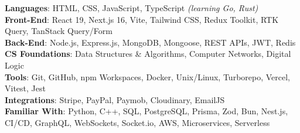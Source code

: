 \documentclass[letterpaper,11pt]{article}
\begin{document}
\begin{itemize}[leftmargin=0.15in, label={}]
  \small{\item{
      \textbf{Languages}{: HTML, CSS, JavaScript, TypeScript
        \emph{(learning Go, Rust)}}
      \\
      \textbf{Front-End}{: React 19, Next.js 16, Vite, Tailwind CSS, Redux
        Toolkit, RTK Query, TanStack Query/Form}
      \\
      \textbf{Back-End}{: Node.js, Express.js, MongoDB, Mongoose, REST APIs,
        JWT, Redis}
      \\
      \textbf{CS Foundations}{: Data Structures \& Algorithms, Computer
        Networks, Digital Logic}
      \\
      \textbf{Tools}{: Git, GitHub, npm Workspaces, Docker, Unix/Linux,
        Turborepo, Vercel, Vitest, Jest}
      \\ \textbf{Integrations}{: Stripe, PayPal, Paymob, Cloudinary, EmailJS} \\
      \textbf{Familiar With}{: Python, C++, SQL, PostgreSQL, Prisma, Zod, Bun,
        Nest.js, CI/CD, GraphQL, WebSockets, Socket.io, AWS, Microservices,
        Serverless}
    }}
\end{itemize}

\end{document}
